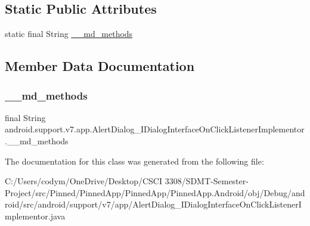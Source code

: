 \subsection*{Static Public Attributes}
\begin{DoxyCompactItemize}
\item 
static final String \hyperlink{classandroid_1_1support_1_1v7_1_1app_1_1_alert_dialog___i_dialog_interface_on_click_listener_implementor_a7aee9cb7287752446ffc15a0c438412c}{\+\_\+\+\_\+md\+\_\+methods}
\end{DoxyCompactItemize}


\subsection{Member Data Documentation}
\mbox{\label{classandroid_1_1support_1_1v7_1_1app_1_1_alert_dialog___i_dialog_interface_on_click_listener_implementor_a7aee9cb7287752446ffc15a0c438412c}} 
\subsubsection{\texorpdfstring{\+\_\+\+\_\+md\+\_\+methods}{\_\_md\_methods}}
{\footnotesize\ttfamily final String android.\+support.\+v7.\+app.\+Alert\+Dialog\+\_\+\+I\+Dialog\+Interface\+On\+Click\+Listener\+Implementor.\+\_\+\+\_\+md\+\_\+methods\hspace{0.3cm}{\ttfamily [static]}}



The documentation for this class was generated from the following file\+:\begin{DoxyCompactItemize}
\item 
C\+:/\+Users/codym/\+One\+Drive/\+Desktop/\+C\+S\+C\+I 3308/\+S\+D\+M\+T-\/\+Semester-\/\+Project/src/\+Pinned/\+Pinned\+App/\+Pinned\+App/\+Pinned\+App.\+Android/obj/\+Debug/android/src/android/support/v7/app/Alert\+Dialog\+\_\+\+I\+Dialog\+Interface\+On\+Click\+Listener\+Implementor.\+java\end{DoxyCompactItemize}
